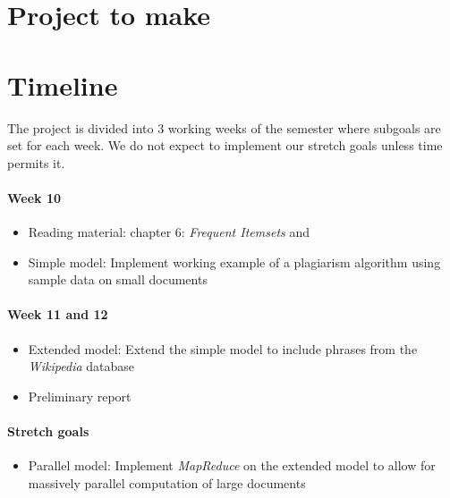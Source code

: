 \section{Project to make}

\section{Timeline}
The project is divided into 3 working weeks of the semester where subgoals are set for each week. We do not expect to implement our stretch goals unless time permits it.

\paragraph{Week 10}
\begin{itemize}
    \item Reading material: \cite{leskovec2014mining} chapter 6: \emph{Frequent Itemsets} and \cite{huang2008similarity}
    \item Simple model: Implement working example of a plagiarism algorithm using sample data on small documents
\end{itemize}

\paragraph{Week 11 and 12}
\begin{itemize}
    \item Extended model: Extend the simple model to include phrases from the \emph{Wikipedia} database
    \item Preliminary report
\end{itemize}

\paragraph{Stretch goals}
\begin{itemize}
    \item Parallel model: Implement \emph{MapReduce} on the extended model to allow for massively parallel computation of large documents
\end{itemize}
